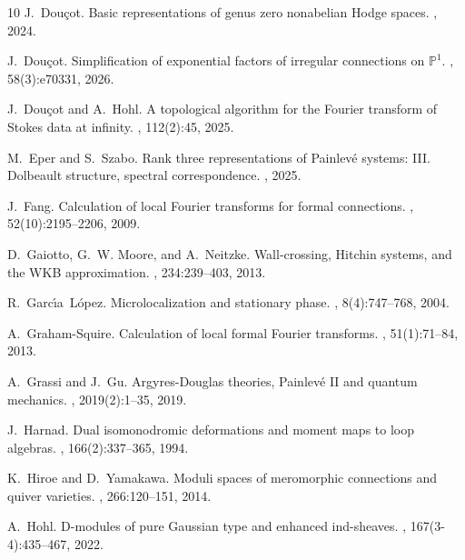 \documentclass[11pt,a4paper]{amsart}
\numberwithin{equation}{section}
\begin{document}
\begin{thebibliography}{10}
J.~Dou{\c{c}}ot.
\newblock Basic representations of genus zero nonabelian {H}odge spaces.
, 2024.

J.~Dou{\c{c}}ot.
\newblock Simplification of exponential factors of irregular connections on
  {$\mathbb P^1$}.
, 58(3):e70331, 2026.

J.~Dou{\c{c}}ot and A.~Hohl.
\newblock A topological algorithm for the {Fourier} transform of {Stokes} data
  at infinity.
, 112(2):45, 2025.

M.~Eper and S.~Szabo.
\newblock Rank three representations of {P}ainlev{\'e} systems: {III}.
  {D}olbeault structure, spectral correspondence.
, 2025.

J.~Fang.
\newblock Calculation of local {Fourier} transforms for formal connections.
, 52(10):2195--2206, 2009.

D.~Gaiotto, G.~W. Moore, and A.~Neitzke.
\newblock Wall-crossing, {H}itchin systems, and the {WKB} approximation.
, 234:239--403, 2013.

R.~Garc{\'{\i}}a~L{\'o}pez.
\newblock Microlocalization and stationary phase.
, 8(4):747--768, 2004.

A.~Graham-Squire.
\newblock Calculation of local formal {F}ourier transforms.
, 51(1):71--84, 2013.

A.~Grassi and J.~Gu.
\newblock Argyres-{D}ouglas theories, {P}ainlev{\'e} {II} and quantum
  mechanics.
, 2019(2):1--35, 2019.

J.~Harnad.
\newblock Dual isomonodromic deformations and moment maps to loop algebras.
, 166(2):337--365, 1994.

K.~Hiroe and D.~Yamakawa.
\newblock Moduli spaces of meromorphic connections and quiver varieties.
, 266:120--151, 2014.

A.~Hohl.
\newblock D-modules of pure {Gaussian} type and enhanced ind-sheaves.
, 167(3-4):435--467, 2022.


\end{thebibliography}
\end{document}
